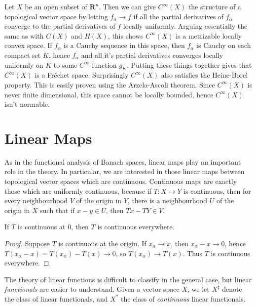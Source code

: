 \begin{example}
    Let $X$ be an open subset of $\mathbf{R}^n$. Then we can give $C^\infty(X)$ the structure of a topological vector space by letting $f_\alpha \to f$ if all the partial derivatives of $f_\alpha$ converge to the partial derivatives of $f$ locally uniformly. Arguing essentially the same as with $C(X)$ and $H(X)$, this shows $C^\infty(X)$ is a metrizable locally convex space. If $f_\alpha$ is a Cauchy sequence in this space, then $f_\alpha$ is Cauchy on each compact set $K$, hence $f_\alpha$ and all it's partial derivatives converges locally uniformly on $K$ to some $C^\infty$ function $g_K$. Putting these things together gives that $C^\infty(X)$ is a Fr\'{e}chet space. Surprisingly $C^\infty(X)$ also satisfies the Heine-Borel property. This is easily proven using the Arzela-Ascoli theorem. Since $C^\infty(X)$ is never finite dimensional, this space cannot be locally bounded, hence $C^\infty(X)$ isn't normable.
\end{example}




\section{Linear Maps}

As in the functional analysis of Banach spaces, linear maps play an important role in the theory. In particular, we are interested in those linear maps between topological vector spaces which are continuous. Continuous maps are exactly those which are uniformly continuous, because if $T: X \to Y$ is continuous, then for every neighbourhood $V$ of the origin in $Y$, there is a neighbourhood $U$ of the origin in $X$ such that if $x - y \in U$, then $Tx - TY \in V$.

\begin{lemma}
    If $T$ is continuous at $0$, then $T$ is continuous everywhere.
\end{lemma}
\begin{proof}
    Suppose $T$ is continuous at the origin. If $x_\alpha \to x$, then $x_\alpha - x \to 0$, hence $T(x_\alpha - x) = T(x_\alpha) - T(x) \to 0$, so $T(x_\alpha) \to T(x)$. Thus $T$ is continuous everywhere.
\end{proof}

The theory of linear functions is difficult to classify in the general case, but linear {\it functionals} are easier to understand. Given a vector space $X$, we let $X^\sharp$ denote the class of linear functionals, and $X^*$ the class of {\it continuous} linear functionals.

